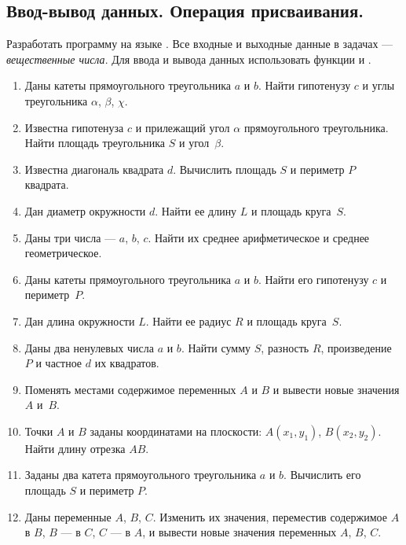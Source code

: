 \subsection[Ввод-вывод данных. Операция присваивания.]{Ввод-вывод данных. Операция присваивания.}
Разработать программу на языке . Все входные и выходные данные в задачах --- \emph{вещественные числа}.
Для ввода и вывода данных использовать функции  и .
\begin{enumerate}
\item Даны катеты прямоугольного треугольника $a$ и $b$. Найти гипотенузу
$c$ и углы треугольника ${\alpha}$, ${\beta}$, ${\chi}$.

\item Известна гипотенуза $c$ и прилежащий угол ${\alpha}$ прямоугольного
треугольника. Найти площадь треугольника $S$ и угол~${\beta}$.

\item Известна диагональ квадрата $d$. Вычислить площадь $S$ и периметр
$P$ квадрата.

\item Дан диаметр окружности $d$. Найти ее длину $L$ и площадь круга~$S$.

\item Даны три числа --- $a$, $b$, $c$. Найти их среднее
арифметическое и среднее геометрическое.

\item Даны катеты прямоугольного треугольника $a$ и $b$. Найти его гипотенузу
$c$ и периметр~$P$.

\item Дан длина окружности $L$. Найти ее радиус $R$ и площадь круга~$S$.

\item Даны два ненулевых числа $a$ и $b$. Найти сумму $S$,
разность $R$, произведение $P$ и частное $d$ их квадратов.

\item Поменять местами содержимое переменных $A$ и $B$ и вывести новые значения $A$ и~$B$.

\item Точки $A$ и $B$ заданы координатами на плоскости:
$A(x_1,y_1)$, $B(x_2,y_2)$. Найти длину отрезка $AB$.

\item Заданы два катета прямоугольного треугольника $a$ и $b$. Вычислить его
площадь $S$ и периметр $P$.

\item Даны переменные $A$, $B$, $C$. Изменить их значения,
переместив содержимое $A$ в $B$, $B$ --- в $C$,
$C$ --- в $A$, и вывести новые значения переменных $A$,
$B$, $C$.


\end{enumerate}
